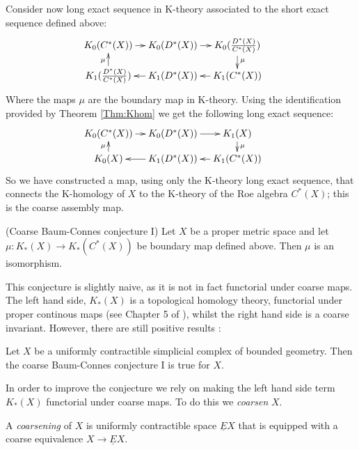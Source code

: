 Consider now long exact sequence in K-theory associated to the short exact sequence defined above:
\begin{equation*}
\xymatrix@=1em{
K_{0}(C^{*}(X)) \ar[r] & K_{0}(D^{*}(X)) \ar[r]& K_{0}(\frac{D^{*}(X)}{C^{*}(X)})\ar[d]^{\mu} & \\
K_{1}(\frac{D^{*}(X)}{C^{*}(X)})\ar[u]^{\mu}& K_{1}(D^{*}(X)) \ar[l]& K_{1}(C^{*}(X))\ar[l] &
}
\end{equation*}
Where the maps $\mu$ are the boundary map in K-theory. Using the identification provided by Theorem \ref{Thm:Khom} we get the following long exact sequence:
\begin{equation*}
\xymatrix@=1em{
K_{0}(C^{*}(X)) \ar[r] & K_{0}(D^{*}(X)) \ar[r]& K_{1}(X)\ar[d]^{\mu} & \\
K_{0}(X)\ar[u]^{\mu}& K_{1}(D^{*}(X)) \ar[l]& K_{1}(C^{*}(X))\ar[l] &
}
\end{equation*}
So we have constructed a map, using only the K-theory long exact sequence, that connects the K-homology of $X$ to the K-theory of the Roe algebra $C^{*}(X)$; this is the coarse assembly map.
\begin{conjecture}\label{conj:CBC1}(Coarse Baum-Connes conjecture I)
Let $X$ be a proper metric space and let $\mu: K_{*}(X) \rightarrow K_{*}(C^{*}(X))$ be boundary map defined above. Then $\mu$ is an isomorphism.
\end{conjecture}
This conjecture is slightly naive, as it is not in fact functorial under coarse maps. The left hand side, $K_{*}(X)$ is a topological homology theory, functorial under proper continous maps (see Chapter 5 of \cite{MR1399087}), whilst the right hand side is a coarse invariant. However, there are still positive results \cite{MR1388312}:

\begin{theorem}
Let $X$ be a uniformly contractible simplicial complex of bounded geometry. Then the coarse Baum-Connes conjecture I is true for $X$.
\end{theorem}

In order to improve the conjecture we rely on making the left hand side term $K_{*}(X)$ functorial under coarse maps. To do this we \textit{coarsen} $X$.

\begin{definition}
A \textit{coarsening} of $X$ is uniformly contractible space $\underline{E}X$ that is equipped with a coarse equivalence $X \rightarrow \underline{E}X$. 
\end{definition}

